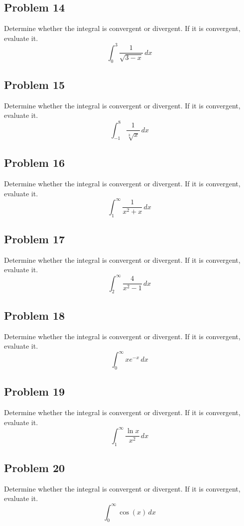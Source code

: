 \documentclass{article}
\begin{document}
\subsection*{Problem 14}
Determine whether the integral is convergent or divergent. If it is convergent, evaluate it.
\[ \int_{0}^{3} \frac{1}{\sqrt{3-x}} \,dx \]

\subsection*{Problem 15}
Determine whether the integral is convergent or divergent. If it is convergent, evaluate it.
\[ \int_{-1}^{8} \frac{1}{\sqrt[3]{x}} \,dx \]

\subsection*{Problem 16}
Determine whether the integral is convergent or divergent. If it is convergent, evaluate it.
\[ \int_{1}^{\infty} \frac{1}{x^2+x} \,dx \]

\subsection*{Problem 17}
Determine whether the integral is convergent or divergent. If it is convergent, evaluate it.
\[ \int_{2}^{\infty} \frac{4}{x^2-1} \,dx \]

\subsection*{Problem 18}
Determine whether the integral is convergent or divergent. If it is convergent, evaluate it.
\[ \int_{0}^{\infty} x e^{-x} \,dx \]

\subsection*{Problem 19}
Determine whether the integral is convergent or divergent. If it is convergent, evaluate it.
\[ \int_{1}^{\infty} \frac{\ln x}{x^2} \,dx \]

\subsection*{Problem 20}
Determine whether the integral is convergent or divergent. If it is convergent, evaluate it.
\[ \int_{0}^{\infty} \cos(x) \,dx \]
\end{document}
